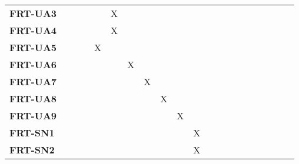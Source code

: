 \documentclass[12pt, titlepage]{article}
\begin{document}
\begin{landscape}
\begin{longtable}{|l|cccccccccccccccc|}
		\textbf{FRT-UA3} & ~                                                         & ~             & ~             & X             & ~             & ~             & ~             & ~             & ~             & ~             & ~             & ~             & ~             \\
		\textbf{FRT-UA4} & ~                                                         & ~             & ~             & X             & ~             & ~             & ~             & ~             & ~             & ~             & ~             & ~             & ~              \\
		\textbf{FRT-UA5} & ~                                                         & ~             & X             & ~             & ~             & ~             & ~             & ~             & ~             & ~             & ~             & ~             & ~             \\
		\textbf{FRT-UA6} & ~                                                         & ~             & ~             & ~             & X             & ~             & ~             & ~             & ~             & ~             & ~             & ~             & ~              \\
		\textbf{FRT-UA7} & ~                                                         & ~             & ~             & ~             & ~             & X             & ~             & ~             & ~             & ~             & ~             & ~             & ~             \\
		\textbf{FRT-UA8} & ~                                                         & ~             & ~             & ~             & ~             & ~             & X             & ~             & ~             & ~             & ~             & ~             & ~             & ~             \\
		\textbf{FRT-UA9} & ~                                                         & ~             & ~             & ~             & ~             & ~             & ~             & X             & ~             & ~             & ~             & ~             & ~             \\
		\textbf{FRT-SN1} & ~                                                         & ~             & ~             & ~             & ~             & ~             & ~             & ~             & X             & ~              & ~             & ~             & ~             \\
		\textbf{FRT-SN2} & ~                                                         & ~             & ~             & ~             & ~             & ~             & ~             & ~             & X             & ~             & ~             & ~             & ~             \\

\end{longtable}
\end{landscape}
\end{document}

